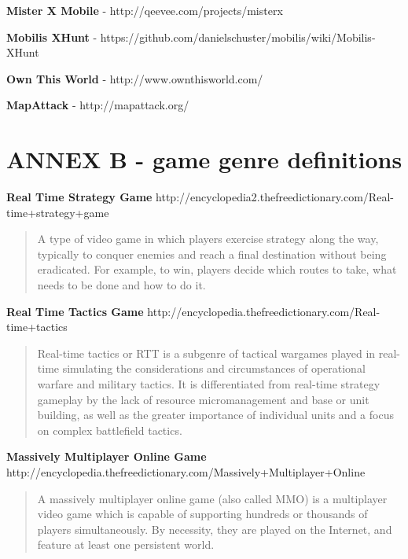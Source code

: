 \documentclass{article}
\begin{document}
\textbf{Mister X Mobile} - http://qeevee.com/projects/misterx \newline

\textbf{Mobilis XHunt} - https://github.com/danielschuster/mobilis/wiki/Mobilis-XHunt
\newline

\textbf{Own This World} - http://www.ownthisworld.com/ \newline

\textbf{MapAttack} - http://mapattack.org/ \newline



\section{ANNEX B - game genre definitions}


\textbf{Real Time Strategy Game}		
http://encyclopedia2.thefreedictionary.com/Real-time+strategy+game
\begin{quote}
A type of video game in which players exercise strategy along the way, typically
to conquer enemies and reach a final destination without being eradicated. For
example, to win, players decide which routes to take, what needs to be done and
how to do it.
\end{quote}

\textbf{Real Time Tactics Game}
	http://encyclopedia.thefreedictionary.com/Real-time+tactics
\begin{quote}
Real-time tactics or RTT is a subgenre of tactical wargames played in real-time
simulating the considerations and circumstances of operational warfare and
military tactics. It is differentiated from real-time strategy gameplay by the
lack of resource micromanagement and base or unit building, as well as the
greater importance of individual units and a focus on complex battlefield
tactics.
\end{quote}

\textbf{Massively Multiplayer Online Game}		
	http://encyclopedia.thefreedictionary.com/Massively+Multiplayer+Online
\begin{quote}
A massively multiplayer online game (also called MMO) is a multiplayer video
game which is capable of supporting hundreds or thousands of players
simultaneously. By necessity, they are played on the Internet, and feature at
least one persistent world.
\end{quote}
	
\end{document}
